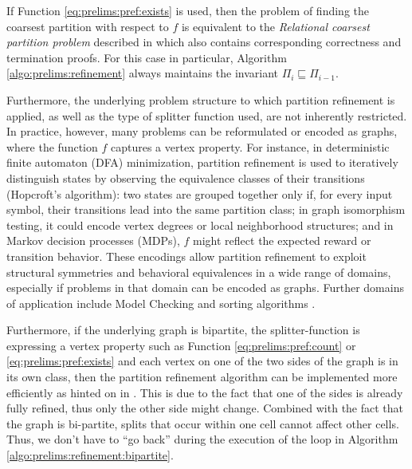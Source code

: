 		If Function \ref{eq:prelims:pref:exists} is used, then the problem of finding the coarsest partition with respect to $f$ is equivalent to the \textit{Relational coarsest partition problem} described in  \cite{paigeThreePartitionRefinement1987} which also contains corresponding correctness and termination proofs.
		For this case in particular, Algorithm \ref{algo:prelims:refinement} always maintains the invariant $\Pi_i \sqsubseteq \Pi_{i-1}$.
		
		Furthermore, the underlying problem structure to which partition refinement is applied, as well as the type of splitter function used, are not inherently restricted. In practice, however, many problems can be reformulated or encoded as graphs, where the function $f$ captures a vertex property.
		For instance, in deterministic finite automaton (DFA) minimization, partition refinement is used to iteratively distinguish states by observing the equivalence classes of their transitions (Hopcroft's algorithm): two states are grouped together only if, for every input symbol, their transitions lead into the same partition class; in graph isomorphism testing, it could encode vertex degrees or local neighborhood structures; and in Markov decision processes (MDPs), $f$ might reflect the expected reward or transition behavior.
		These encodings allow partition refinement to exploit structural symmetries and behavioral equivalences in a wide range of domains, especially if problems in that domain can be encoded as graphs. 
		Further domains of application include Model Checking \cite{baierPrinciplesModelChecking2008} and sorting algorithms \cite{mehlhornAlgorithmsDataStructures2008}.
	
		Furthermore, if the underlying graph is bipartite, the splitter-function is expressing a vertex property such as Function \ref{eq:prelims:pref:count} or \ref{eq:prelims:pref:exists} and each vertex on one of the two sides of the graph is in its own class, then the partition refinement algorithm can be implemented more efficiently as hinted on in \cite{salvagninDetectingSemanticGroups2016}.
		This is due to the fact that one of the sides is already fully refined, thus only the other side might change. Combined with the fact that the graph is bi-partite, splits that occur within one cell cannot affect other cells.
		Thus, we don't have to \enquote{go back} during the execution of the loop in Algorithm \ref{algo:prelims:refinement:bipartite}.
		
